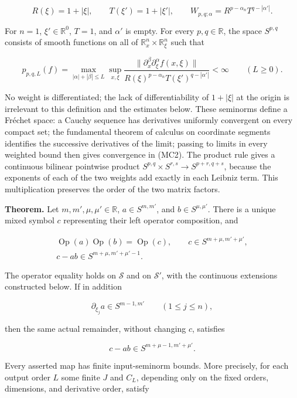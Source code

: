 \documentclass[
  11pt,
]{article}
\begin{document}
\[
R(\xi)=1+|\xi|,\qquad T(\xi')=1+|\xi'|,
\qquad W_{p,q;\alpha}=R^{p-\alpha_n}T^{q-|\alpha'|}.
\tag{MC1}
\]

For \(n=1\), \(\xi'\in\mathbb R^0\), \(T=1\), and \(\alpha'\) is empty.
For every \(p,q\in\mathbb R\), the space \(S^{p,q}\) consists of smooth
functions on all of \(\mathbb R_x^n\times\mathbb R_\xi^n\) such that

\[
p_{p,q,L}(f)=\max_{|\alpha|+|\beta|\leq L}
\sup_{x,\xi}\frac{\|\partial_x^\beta\partial_\xi^\alpha f(x,\xi)\|}
{R(\xi)^{p-\alpha_n}T(\xi')^{q-|\alpha'|}}<\infty
\qquad(L\geq0).
\tag{MC2}
\]

No weight is differentiated; the lack of differentiability of
\(1+|\xi|\) at the origin is irrelevant to this definition and the
estimates below. These seminorms define a Fréchet space: a Cauchy
sequence has derivatives uniformly convergent on every compact set; the
fundamental theorem of calculus on coordinate segments identifies the
successive derivatives of the limit; passing to limits in every weighted
bound then gives convergence in (MC2). The product rule gives a
continuous bilinear pointwise product
\(S^{p,q}\times S^{r,s}\to S^{p+r,q+s}\), because the exponents of each
of the two weights add exactly in each Leibniz term. This multiplication
preserves the order of the two matrix factors.

\textbf{Theorem.} Let \(m,m',\mu,\mu'\in\mathbb R\), \(a\in S^{m,m'}\),
and \(b\in S^{\mu,\mu'}\). There is a unique mixed symbol \(c\)
representing their left operator composition, and

\[
\begin{gathered}
\operatorname{Op}(a)\operatorname{Op}(b)=\operatorname{Op}(c),
\qquad c\in S^{m+\mu,m'+\mu'},\\
c-ab\in S^{m+\mu,m'+\mu'-1}.
\end{gathered}
\tag{MC3}
\]

The operator equality holds on \(\mathcal S\) and on \(\mathcal S'\),
with the continuous extensions constructed below. If in addition

\[
\partial_{\xi_j}a\in S^{m-1,m'}\qquad(1\leq j\leq n),
\tag{MC4}
\]

then the same actual remainder, without changing \(c\), satisfies

\[
c-ab\in S^{m+\mu-1,m'+\mu'}.
\tag{MC5}
\]

Every asserted map has finite input-seminorm bounds. More precisely, for
each output order \(L\) some finite \(J\) and \(C_L\), depending only on
the fixed orders, dimensions, and derivative order, satisfy
\end{document}
